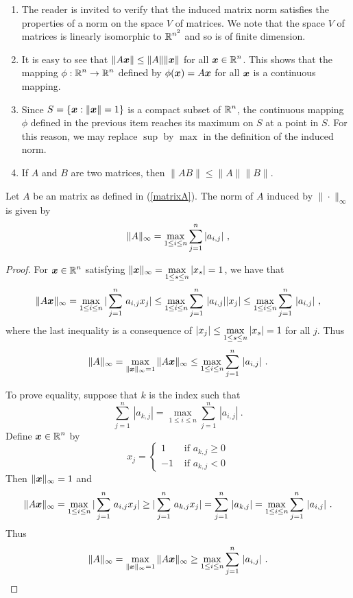 \begin{rmkList}\label{nABppnAnB}
\begin{enumerate}
\item The reader is invited to verify that the induced matrix norm
satisfies the properties of a norm on the space $V$ of \nn matrices.
We note that the space $V$ of \nn matrices is linearly isomorphic to
$\displaystyle \mathbb{R}^{n^2}$ and so is of finite dimension.
\item It is easy to see that $\|A\bm{x}\| \leq \|A\|\|\bm{x}\|$ for
all $\displaystyle \bm{x} \in \mathbb{R}^n$.  This shows that the mapping
$\displaystyle \phi:\mathbb{R}^n \to \mathbb{R}^n$ defined by
$\phi(\bm{x}) = A\bm{x}$ for all
$\bm{x}$ is a continuous mapping. \label{MatrNormP1}
\item Since $S = \{ \bm{x} : \|\bm{x}\| = 1\}$ is a compact subset of
$\displaystyle \mathbb{R}^n$, the continuous mapping $\phi$ defined in the
previous item reaches its maximum on $S$ at a point in $S$.   For this
reason, we may replace $\sup$ by $\max$ in the definition of the induced norm.
\item If $A$ and $B$ are two \nn matrices, then
$\|AB\| \leq \|A\|\|B\|$. \label{MatrNormP2}
\end{enumerate}
\end{rmkList}

\begin{theorem}
Let $A$ be an \nn matrix as defined in (\ref{matrixA}).  The
norm of $A$ induced by $\|\cdot\|_\infty$ is given by
\[
\displaystyle \| A \|_\infty
= \max_{1\leq i \leq n} \sum_{j=1}^{n} | a_{i,j} | \ ,
\]
\label{normAinfty}
\end{theorem}

\begin{proof}
For $\displaystyle \bm{x} \in \mathbb{R}^n$ satisfying
$\displaystyle \|\bm{x}\|_\infty = \max_{1\leq s \leq n} |x_s| = 1$,
we have that
\[
\|A\bm{x}\|_\infty
= \max_{1\leq i \leq n} |\sum_{j=1}^n\,a_{i,j}x_j|
\leq \max_{1\leq i \leq n} \sum_{j=1}^n\,|a_{i,j}| |x_j|
\leq \max_{1\leq i \leq n} \sum_{j=1}^n\,|a_{i,j}| \ ,
\]
where the last inequality is a consequence of
$\displaystyle |x_j| \leq \max_{1\leq s \leq n} |x_s| = 1$ for all
$j$.  Thus
\[
\|A\|_\infty = \max_{\|\bm{x} \|_\infty =1 } \| A \bm{x} \|_\infty
\leq \max_{1\leq i \leq n} \sum_{j=1}^n\,|a_{i,j}| \ .
\]

To prove equality, suppose that $k$ is the index such that
\[
\sum_{j=1}^n\,|a_{k,j}| = \max_{1\leq i \leq n} \sum_{j=1}^n\,|a_{i,j}| \ .
\]
Define $\displaystyle \bm{x} \in \mathbb{R}^n$ by
\[
x_j = \begin{cases}
1 & \text{ if $a_{k,j} \geq 0$}\\
-1 & \text{ if $a_{k,j} < 0$}
\end{cases}
\]
Then $\|\bm{x}\|_\infty = 1$ and
\[
\|A\bm{x}\|_\infty =
\max_{1\leq i \leq n} |\sum_{j=1}^n\,a_{i,j}x_j|
\geq |\sum_{j=1}^n\,a_{k,j}x_j|
= \sum_{j=1}^n\,|a_{k,j}|
=\max_{1\leq i \leq n} \sum_{j=1}^n\,|a_{i,j}| \ .
\]
Thus
\[
\|A\|_\infty = \max_{\|\VEC{x} \|_\infty =1 } \| A \VEC{x} \|_\infty
\geq \max_{1\leq i \leq n} \sum_{j=1}^n\,|a_{i,j}| \ .  \qedhere
\]
\end{proof}

